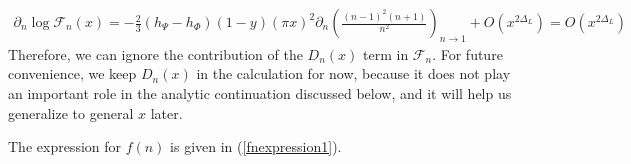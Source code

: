 \documentclass[11pt]{article}
\newcommand{\mO}{\mathcal{O}}
\newcommand{\nn}{\nonumber}
\newcommand{\lb}{\left(}
\newcommand{\rb}{\right)}
\begin{document}
\begin{align}
\partial_n\log \mathcal{F}_n(x)=-\frac{2}{3}(h_\Psi-h_\Phi)(1-y)(\pi x)^2\partial_n \lb  \frac{(n-1)^2 (n+1)}{n^2}\rb_{n\to 1}+O(x^{2\Delta_L})=O(x^{2\Delta_L})
\end{align}
Therefore, we can ignore the contribution of the $D_n(x)$ term in $\mathcal{F}_n$. For future convenience, we keep $D_n(x)$ in the calculation for now, because it does not play an important role in the analytic continuation discussed below, and it will help us generalize to general $x$ later. 


The expression for $f(n)$ is given in (\ref{fnexpression1}). 
\end{document}
